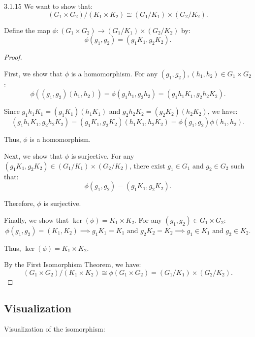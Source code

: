 \documentclass[12pt]{amsart}
\theoremstyle{definition}
\numberwithin{equation}{section}
\begin{document}
\begin{exercise}{3.1.15}
    We want to show that:
    \[
    (G_1 \times G_2)/(K_1 \times K_2) \cong (G_1/K_1) \times (G_2/K_2).
    \]
    
    Define the map \(\phi: (G_1 \times G_2) \rightarrow (G_1/K_1) \times (G_2/K_2)\) by:
    \[
    \phi(g_1, g_2) = (g_1 K_1, g_2 K_2).
    \]
    
    \begin{proof} \( \)
    
    First, we show that \(\phi\) is a homomorphism. For any \((g_1, g_2), (h_1, h_2) \in G_1 \times G_2\):
    \[
    \phi((g_1, g_2)(h_1, h_2)) = \phi(g_1 h_1, g_2 h_2) = (g_1 h_1 K_1, g_2 h_2 K_2).
    \]
    
    Since \(g_1 h_1 K_1 = (g_1 K_1)(h_1 K_1)\) and \(g_2 h_2 K_2 = (g_2 K_2)(h_2 K_2)\), we have:
    \[
    (g_1 h_1 K_1, g_2 h_2 K_2) = (g_1 K_1, g_2 K_2)(h_1 K_1, h_2 K_2) = \phi(g_1, g_2)\phi(h_1, h_2).
    \]
    
    Thus, \(\phi\) is a homomorphism.
    
    Next, we show that \(\phi\) is surjective. For any \((g_1 K_1, g_2 K_2) \in (G_1/K_1) \times (G_2/K_2)\), there exist \(g_1 \in G_1\) and \(g_2 \in G_2\) such that:
    \[
    \phi(g_1, g_2) = (g_1 K_1, g_2 K_2).
    \]
    
    Therefore, \(\phi\) is surjective.
    
    Finally, we show that \(\ker(\phi) = K_1 \times K_2\). For any \((g_1, g_2) \in G_1 \times G_2\):
    \[
    \phi(g_1, g_2) = (K_1, K_2) \implies g_1 K_1 = K_1 \text{ and } g_2 K_2 = K_2 \implies g_1 \in K_1 \text{ and } g_2 \in K_2.
    \]
    
    Thus, \(\ker(\phi) = K_1 \times K_2\).
    
    By the First Isomorphism Theorem, we have:
    \[
    (G_1 \times G_2)/(K_1 \times K_2) \cong \phi(G_1 \times G_2) = (G_1/K_1) \times (G_2/K_2).
    \]
    
    \end{proof}

    \subsection*{Visualization}

    Visualization of the isomorphism:

    \begin{center}
\end{center}
\end{exercise}
\end{document}
